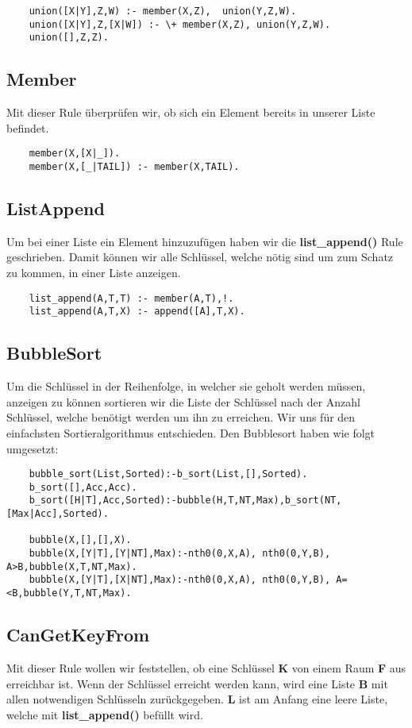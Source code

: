 \begin{verbatim}
    union([X|Y],Z,W) :- member(X,Z),  union(Y,Z,W).
    union([X|Y],Z,[X|W]) :- \+ member(X,Z), union(Y,Z,W).
    union([],Z,Z).
\end{verbatim}

\subsection{Member}
Mit dieser Rule überprüfen wir, ob sich ein Element bereits in 
unserer Liste befindet.

\begin{verbatim}
    member(X,[X|_]).
    member(X,[_|TAIL]) :- member(X,TAIL).
\end{verbatim}

\newpage

\subsection{ListAppend}
Um bei einer Liste ein Element hinzuzufügen haben wir die \textbf{list\_append()} Rule geschrieben. 
Damit können wir alle Schlüssel, welche nötig sind um zum
Schatz zu kommen, in einer Liste anzeigen.

\begin{verbatim}
    list_append(A,T,T) :- member(A,T),!.
    list_append(A,T,X) :- append([A],T,X).
\end{verbatim}

\subsection{BubbleSort}
Um die Schlüssel in der Reihenfolge, in welcher sie geholt werden müssen, anzeigen zu können sortieren wir
die Liste der Schlüssel nach der Anzahl Schlüssel, welche benötigt werden um ihn zu erreichen.
Wir uns für den einfachsten Sortieralgorithmus 
entschieden. Den Bubblesort haben wie folgt umgesetzt:

\begin{verbatim}
    bubble_sort(List,Sorted):-b_sort(List,[],Sorted).
    b_sort([],Acc,Acc).
    b_sort([H|T],Acc,Sorted):-bubble(H,T,NT,Max),b_sort(NT,[Max|Acc],Sorted).
    
    bubble(X,[],[],X).
    bubble(X,[Y|T],[Y|NT],Max):-nth0(0,X,A), nth0(0,Y,B), A>B,bubble(X,T,NT,Max).
    bubble(X,[Y|T],[X|NT],Max):-nth0(0,X,A), nth0(0,Y,B), A=<B,bubble(Y,T,NT,Max).
\end{verbatim}

\subsection{CanGetKeyFrom}
Mit dieser Rule wollen wir feststellen, ob eine Schlüssel \textbf{K} von einem 
Raum \textbf{F} aus erreichbar ist. Wenn der Schlüssel erreicht werden kann, wird eine Liste \textbf{B}
mit allen notwendigen Schlüsseln zurückgegeben. \textbf{L} ist am Anfang eine leere Liste, welche mit 
\textbf{list\_append()} befüllt wird.

